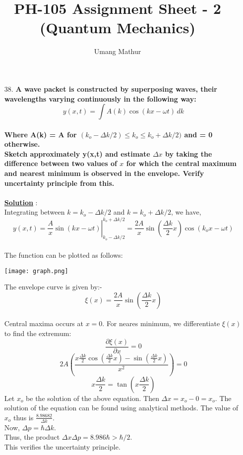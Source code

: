 \documentclass[10pt, a4paper]{article}
\begin{document}
	\title{PH-105 Assignment Sheet - 2 (Quantum Mechanics)}
	\date{}
	\author{Umang Mathur}
	\maketitle
	\begin{enumerate}
		\item[38.] {\bf A wave packet is constructed by superposing waves, their wavelengths varying continuously in the following way:\\
				\[ y(x,t) = \int A(k)\cos{(kx-\omega t)} \,dk \] \\
			Where A(k) = A for $(k_{o} - \Delta k/2) \leq k_{o} \leq k_{o} + \Delta k/2)$ and = 0 otherwise.\\
			Sketch approximately y(x,t) and estimate $\Delta x$ by taking the difference between two values of $x$ for which the central maximum and nearest minimum is observed in the envelope. Verify uncertainty principle from this. }\\\\
		{\underline {\bf Solution}} :\\
		
		Integrating between $k = k_{o} - \Delta k/2$ and $k = k_{o} + \Delta k/2$, we have,\\
		 		\[ y(x,t) = \left. \frac{A}{x} \sin{(kx-\omega t)} \right|_{k_{o} - \Delta k/2}^{k_{o} + \Delta k/2} = \frac{2A}{x} \sin{(\frac{\Delta k}{2}x)}\cos{(k_{o}x - \omega t)} \]\\
		 		
		The function can be plotted as follows:
		
		\texttt{[image: graph.png]}
		
		The envelope curve is given by:-
				\[ \xi(x) = \frac{2A}{x}\sin{(\frac{\Delta k}{2}x)} \] \\
		Central maxima occurs at $x = 0$. For neares minimum, we differentiate $\xi(x)$ to find the extremum:
				\[ \frac{\partial \xi(x)}{\partial x} = 0\]
				\[ 2A(\frac{x\frac{\Delta k}{2}\cos{(\frac{\Delta k}{2}x)} - \sin{(\frac{\Delta k}{2}x)}}{x^{2}}) = 0 \]
				\[ x\frac{\Delta k}{2} = \tan{(x\frac{\Delta k}{2})} \]
		Let $x_{o}$ be the solution of the above equation. Then $\Delta x = x_{o} - 0 = x_{o}$. The solution of the equation can be found using analytical methods. The value of $x_{o}$ thus is $\frac{8.98682}{\Delta k}$.\\
		Now, $\Delta p = \hbar \Delta k$.\\
		Thus, the product $ \Delta x \Delta p = 8.986 \hbar > \hbar / 2$.\\
		This verifies the uncertainty principle.
				
	\end{enumerate}
\end{document}
